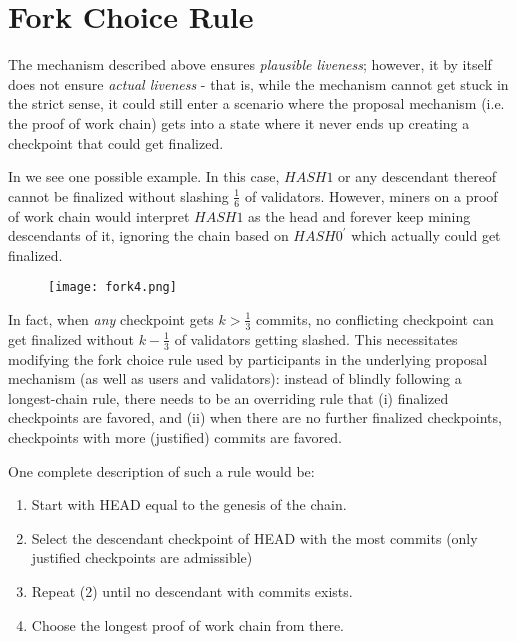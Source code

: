 \documentclass[12pt, final]{article}
\begin{document}
\section{Fork Choice Rule}
\label{sect:forkchoice}

The mechanism described above ensures \textit{plausible liveness}; however, it by itself does not ensure \textit{actual liveness} - that is, while the mechanism cannot get stuck in the strict sense, it could still enter a scenario where the proposal mechanism (i.e. the proof of work chain) gets into a state where it never ends up creating a checkpoint that could get finalized.

In  we see one possible example.  In this case, $HASH1$ or any descendant thereof cannot be finalized without slashing $\frac{1}{6}$ of validators. However, miners on a proof of work chain would interpret $HASH1$ as the head and forever keep mining descendants of it, ignoring the chain based on $HASH0^\prime$ which actually could get finalized.

\begin{figure}[h!tb]
\centering
\texttt{[image: fork4.png]}
\caption{}
\label{fig:forkchoice}
\end{figure}

In fact, when \textit{any} checkpoint gets $k > \frac{1}{3}$ commits, no conflicting checkpoint can get finalized without $k - \frac{1}{3}$ of validators getting slashed. This necessitates modifying the fork choice rule used by participants in the underlying proposal mechanism (as well as users and validators): instead of blindly following a longest-chain rule, there needs to be an overriding rule that (i) finalized checkpoints are favored, and (ii) when there are no further finalized checkpoints, checkpoints with more (justified) commits are favored.

One complete description of such a rule would be:

\begin{enumerate}
\item Start with HEAD equal to the genesis of the chain.
\item Select the descendant checkpoint of HEAD with the most commits (only justified checkpoints are admissible)
\item Repeat (2) until no descendant with commits exists.
\item Choose the longest proof of work chain from there.
\end{enumerate}
\end{document}
